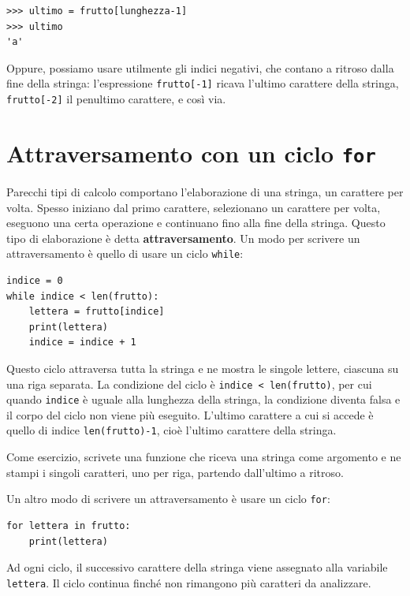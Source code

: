 \documentclass[10pt]{book}
\begin{document}
\begin{verbatim}
>>> ultimo = frutto[lunghezza-1]
>>> ultimo
'a'
\end{verbatim}
%
Oppure, possiamo usare utilmente gli indici negativi, che contano a ritroso dalla fine della stringa: l'espressione {\tt frutto[-1]} ricava l'ultimo carattere della stringa, {\tt frutto[-2]} il penultimo carattere, e così via.


\section{Attraversamento con un ciclo {\tt for}}
\label{for}

Parecchi tipi di calcolo comportano l'elaborazione di una stringa, un carattere per volta. Spesso iniziano dal primo carattere, selezionano un carattere per volta, eseguono una certa operazione e continuano fino alla fine della stringa. Questo tipo di elaborazione è detta {\bf attraversamento}. Un modo per scrivere un attraversamento è quello di usare un ciclo {\tt while}:

\begin{verbatim}
indice = 0
while indice < len(frutto):
    lettera = frutto[indice]
    print(lettera)
    indice = indice + 1
\end{verbatim}
%
Questo ciclo attraversa tutta la stringa e ne mostra le singole lettere, ciascuna su una riga separata. La condizione del ciclo è {\tt indice < len(frutto)}, per cui quando {\tt indice} è uguale alla lunghezza della stringa, la condizione diventa falsa e il corpo del ciclo non viene più eseguito. L'ultimo carattere a cui si accede è quello di indice {\tt len(frutto)-1}, cioè l'ultimo carattere della stringa.

Come esercizio, scrivete una funzione che riceva una stringa come argomento e ne stampi i singoli caratteri, uno per riga, partendo dall'ultimo a ritroso.

Un altro modo di scrivere un attraversamento è usare un ciclo {\tt for}:

\begin{verbatim}
for lettera in frutto:
    print(lettera)
\end{verbatim}
%
Ad ogni ciclo, il successivo carattere della stringa viene assegnato alla variabile {\tt lettera}. Il ciclo continua finché non rimangono più caratteri da analizzare.
\end{document}
